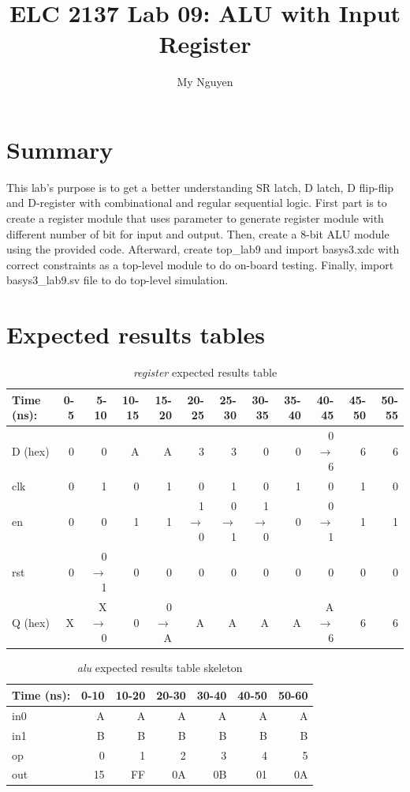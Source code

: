 \documentclass[11pt]{article}
\begin{document}
\title{ELC 2137 Lab 09: ALU with Input Register}
\author{My Nguyen}

\maketitle

\section*{Summary}
This lab's purpose is to get a better understanding SR latch, D latch, D flip-flip and D-register with combinational and regular sequential logic. First part is to create a register module that uses parameter to generate register module with different number of bit for input and output. Then, create a 8-bit ALU module using the provided code. Afterward, create top\_lab9 and import basys3.xdc with correct constraints as a top-level module to do on-board testing. Finally, import basys3\_lab9.sv file to do top-level simulation.

\section*{Expected results tables}
\begin{table}[ht]\centering
	\caption{\textit{register} expected results table}
	\label{ALU:tbl:register_ERT}\medskip
	\begin{tabular}{l|rrrrrrrrrrr}
		Time (ns): & 0-5 & 5-10 & 10-15 & 15-20 & 20-25 & 25-30 & 30-35 & 35-40 & 40-45 & 45-50 & 50-55 \\
		\midrule
		D (hex) & 0 & 0 	  & A & A 	    & 3 	     & 3 	   & 0 	     & 0 & 0$\to$6 & 6 & 6 \\
		clk     & 0 & 1 	  & 0 & 1 	    & 0 	     & 1 	   & 0 	     & 1 & 0 	   & 1 & 0 \\
		en  	& 0 & 0 	  & 1 & 1	    & 1$\to$0 & 0$\to$1 & 1$\to$0 & 0 & 0$\to$1 & 1 & 1 \\
		rst 	& 0 & 0$\to$1 & 0 & 0 	    & 0 		 & 0 	   & 0		 & 0 & 0	   & 0 & 0 \\
		\midrule
		Q (hex) & X & X$\to$0 & 0 & 0$\to$A & A		 & A	   & A 		 & A & A$\to$6 & 6 & 6\\
		\bottomrule
	\end{tabular}
\end{table}

\begin{table}[ht]\centering
	\caption{\textit{alu} expected results table skeleton}
	\label{ALU:tbl:alu_ERT}\medskip
	\begin{tabular}{l|rrrrrr}
		Time (ns): & 0-10 & 10-20 & 20-30 & 30-40 & 40-50 & 50-60 \\
		\midrule
		in0 & A & A & A & A & A & A \\
		in1 & B & B & B & B & B & B \\
		op	& 0 & 1 & 2 & 3 & 4 & 5 \\
		\midrule
		out & 15 & FF & 0A & 0B & 01 & 0A \\
		\bottomrule
	\end{tabular}
\end{table}
\end{document}
